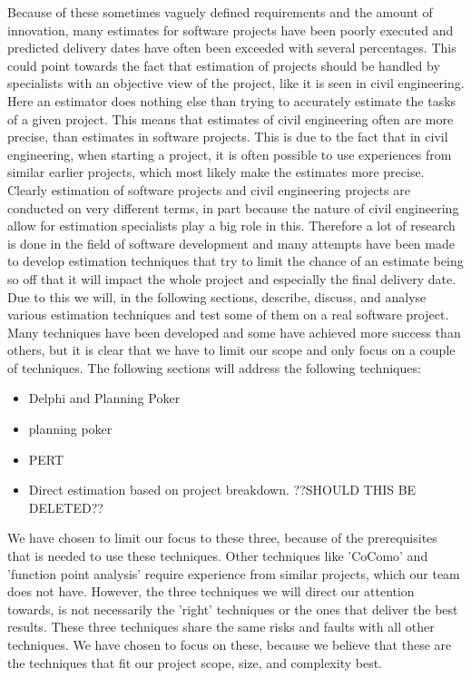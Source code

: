 Because of these sometimes vaguely defined requirements and the amount of innovation, many estimates for software projects have been poorly executed and predicted delivery dates have often been exceeded with several percentages. This could point towards the fact that estimation of projects should be handled by specialists with an objective view of the project, like it is seen in civil engineering. Here an estimator does nothing else than trying to accurately estimate the tasks of a given project\cite[p.140]{ProjectManagement_b}. This means that estimates of civil engineering often are more precise, than estimates in software projects. This is due to the fact that in civil engineering, when starting a project, it is often possible to use experiences from similar earlier projects, which most likely make the estimates more precise. \\
Clearly estimation of software projects and civil engineering projects are conducted on very different terms, in part because the nature of civil engineering allow for estimation specialists play a big role in this. Therefore a lot of research is done in the field of software development and many attempts have been made to develop estimation techniques that try to limit the chance of an estimate being so off that it will impact the whole project and especially the final delivery date. \\
Due to this we will, in the following sections, describe, discuss, and analyse various estimation techniques and test some of them on a real software project. Many techniques have been developed and some have achieved more success than others, but it is clear that we have to limit our scope and only focus on a couple of techniques. The following sections will address the following techniques:
\begin{itemize}
\item Delphi and Planning Poker 
\item planning poker 
\item PERT 
\item Direct estimation based on project breakdown. ??SHOULD THIS BE DELETED??
\end{itemize}
We have chosen to limit our focus to these three, because of the prerequisites that is needed to use these techniques. Other techniques like 'CoComo' and 'function point analysis' require experience from similar projects, which our team does not have. However, the three techniques we will direct our attention towards, is not necessarily the 'right' techniques or the ones that deliver the best results. These three techniques share the same risks and faults with all other techniques. We have chosen to focus on these, because we believe that these are the techniques that fit our project scope, size, and complexity best.
\\


